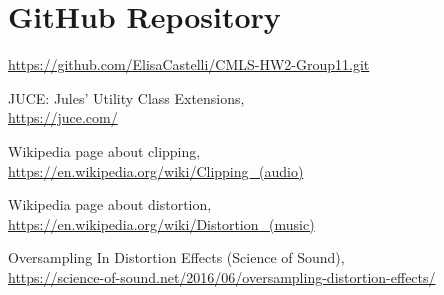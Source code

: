 \documentclass[letterpaper, 12pt]{article}
\begin{document}
	\section{GitHub Repository}
	\url{https://github.com/ElisaCastelli/CMLS-HW2-Group11.git}
	
	\medskip
	
	\begin{thebibliography}{99}
		
		JUCE: Jules' Utility Class Extensions,
		\\
		\url{https://juce.com/} 
		
		Wikipedia page about clipping, 
		\\
		\url{https://en.wikipedia.org/wiki/Clipping_(audio)}
		
		Wikipedia page about distortion, 
		\\
		\url{https://en.wikipedia.org/wiki/Distortion_(music)}
		
		Oversampling In Distortion Effects (Science of Sound),
		\\
		\url{https://science-of-sound.net/2016/06/oversampling-distortion-effects/}
		
	\end{thebibliography}
	
	
\end{document}
